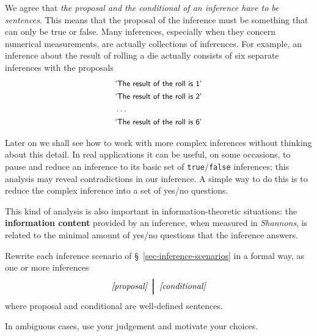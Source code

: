 \documentclass[
  a4paper,
  DIV=11,
  numbers=noendperiod,
  oneside]{scrreprt}
\begin{document}
\hfill\break

We agree that {\emph{the proposal and the conditional of an inference
have to be sentences}}. This means that the proposal of the inference
must be something that can only be true or false. Many inferences,
especially when they concern numerical measurements, are actually
collections of inferences. For example, an inference about the result of
rolling a die actually consists of six separate inferences with the
proposals \[
\begin{aligned}
&\textsf{\small`The result of the roll is 1'}
\\
&\textsf{\small`The result of the roll is 2'}
\\
&\dotso
\\
&\textsf{\small`The result of the roll is 6'}
\end{aligned}
\]

Later on we shall see how to work with more complex inferences without
thinking about this detail. In real applications it can be useful, on
some occasions, to pause and reduce an inference to its basic set of
\texttt{true}/\texttt{false} inferences; this analysis may reveal
contradictions in our inference. A simple way to do this is to reduce
the complex inference into a set of yes/no questions.

This kind of analysis is also important in information-theoretic
situations: the {\textbf{information content}} provided by an inference,
when measured in \emph{Shannons}, is related to the minimal amount of
yes/no questions that the inference answers.

\begin{tcolorbox}[enhanced jigsaw, colback=white, breakable, coltitle=black, bottomtitle=1mm, title={\faIcon{user-edit} Exercise}, leftrule=.75mm, opacitybacktitle=0.6, opacityback=0, colframe=quarto-callout-caution-color-frame, colbacktitle=quarto-callout-caution-color!10!white, rightrule=.15mm, arc=.35mm, titlerule=0mm, toprule=.15mm, left=2mm, toptitle=1mm, bottomrule=.15mm]

Rewrite each inference scenario of §~\ref{sec-inference-scenarios} in a
formal way, as one or more inferences \[
\textit{[proposal]}\ \pmb{\nonscript\:\Big\vert\nonscript\:\mathopen{}}\ \textit{[conditional]}
\] where proposal and conditional are well-defined sentences.

In ambiguous cases, use your judgement and motivate your choices.

\end{tcolorbox}
\end{document}
